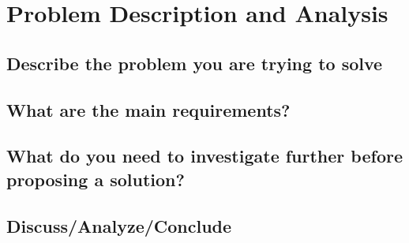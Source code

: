 \section{Problem Description and Analysis}
\subsection{Describe the problem you are trying to solve}
\subsection{What are the main requirements?}
\subsection{What do you need to investigate further before proposing a solution?}
\subsection{Discuss/Analyze/Conclude}